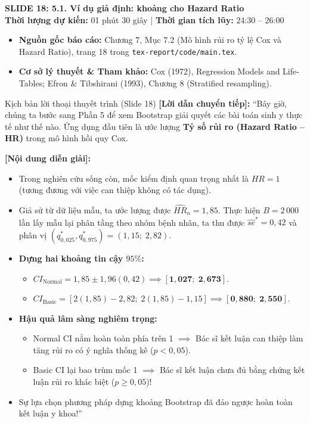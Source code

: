 \documentclass[10pt,a4paper]{article}
\newcommand{\slideheader}[4]{
    \vspace{0.4cm}
    \begin{tcolorbox}[colback=primary!7!white, colframe=primary, arc=2mm, boxrule=1pt, left=4mm, right=4mm, top=2.5mm, bottom=2.5mm]
        {\Large\bfseries\color{primary} SLIDE #1: #2}\\[0.1cm]
        {\small\textbf{Thời lượng dự kiến:} #3 \quad | \quad \textbf{Thời gian tích lũy:} #4}
    \end{tcolorbox}
    \vspace{0.15cm}
}
\begin{document}
\newpage

\slideheader{18}{5.1. Ví dụ giả định: khoảng cho Hazard Ratio}{01 phút 30 giây}{24:30 -- 26:00}

\begin{itemize}
    \item \textbf{Nguồn gốc báo cáo:} Chương 7, Mục 7.2 (Mô hình rủi ro tỷ lệ Cox và Hazard Ratio), trang 18 trong \texttt{tex-report/code/main.tex}.
    \item \textbf{Cơ sở lý thuyết \& Tham khảo:} Cox (1972), Regression Models and Life-Tables; Efron \& Tibshirani (1993), Chương 8 (Stratified resampling).
\end{itemize}

\begin{scriptbox}{Kịch bản lời thoại thuyết trình (Slide 18)}
    \textbf{[Lời dẫn chuyển tiếp]:} ``Bây giờ, chúng ta bước sang Phần 5 để xem Bootstrap giải quyết các bài toán sinh y thực tế như thế nào. Ứng dụng đầu tiên là ước lượng \textbf{Tỷ số rủi ro (Hazard Ratio -- HR)} trong mô hình hồi quy Cox.
    
    \textbf{[Nội dung diễn giải]:} 
    \begin{itemize}
        \item Trong nghiên cứu sống còn, mốc kiểm định quan trọng nhất là $HR = 1$ (tương đương với việc can thiệp không có tác dụng).
        \item Giả sử từ dữ liệu mẫu, ta ước lượng được $\widehat{HR}_n = 1{,}85$. Thực hiện $B=2\,000$ lần lấy mẫu lại phân tầng theo nhóm bệnh nhân, ta thu được $\widehat{se}^* = 0{,}42$ và phân vị $(q_{0{,}025}^*, q_{0{,}975}^*) = (1{,}15;\; 2{,}82)$.
        \item \textbf{Dựng hai khoảng tin cậy $95\%$:}
        \begin{itemize}
            \item $CI_{\text{Normal}} = 1{,}85 \pm 1{,}96(0{,}42) \implies \mathbf{[1{,}027;\; 2{,}673]}$.
            \item $CI_{\text{Basic}} = [2(1{,}85) - 2{,}82;\; 2(1{,}85) - 1{,}15] \implies \mathbf{[0{,}880;\; 2{,}550]}$.
        \end{itemize}
        \item \textbf{Hậu quả lâm sàng nghiêm trọng:}
        \begin{itemize}
            \item Normal CI nằm hoàn toàn phía trên 1 $\implies$ Bác sĩ kết luận can thiệp làm tăng rủi ro có ý nghĩa thống kê ($p < 0{,}05$).
            \item Basic CI lại bao trùm mốc 1 $\implies$ Bác sĩ kết luận chưa đủ bằng chứng kết luận rủi ro khác biệt ($p \ge 0{,}05$)!
        \end{itemize}
        \item Sự lựa chọn phương pháp dựng khoảng Bootstrap đã đảo ngược hoàn toàn kết luận y khoa!''
    \end{itemize}
\end{scriptbox}
\end{document}
